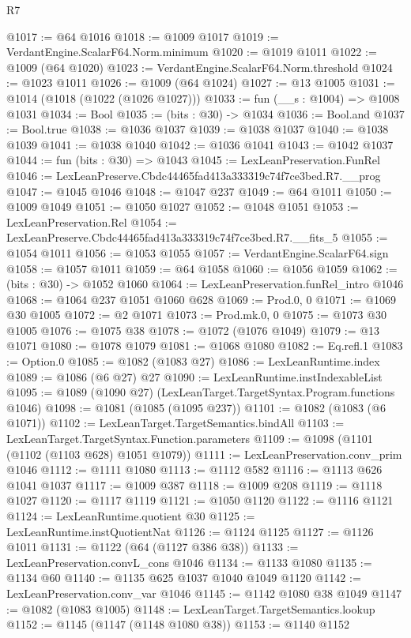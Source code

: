 \begin{lexlean}{R7}
\begin{coremodule}
@1017 := @64 @1016
@1018 := @1009 @1017
@1019 := VerdantEngine.ScalarF64.Norm.minimum
@1020 := @1019 @1011
@1022 := @1009 (@64 @1020)
@1023 := VerdantEngine.ScalarF64.Norm.threshold
@1024 := @1023 @1011
@1026 := @1009 (@64 @1024)
@1027 := @13 @1005
@1031 := @1014 (@1018 (@1022 (@1026 @1027)))
@1033 := fun (__s : @1004) => @1008 @1031
@1034 := Bool
@1035 := (bits : @30) -> @1034
@1036 := Bool.and
@1037 := Bool.true
@1038 := @1036 @1037
@1039 := @1038 @1037
@1040 := @1038 @1039
@1041 := @1038 @1040
@1042 := @1036 @1041
@1043 := @1042 @1037
@1044 := fun (bits : @30) => @1043
@1045 := LexLeanPreservation.FunRel
@1046 := LexLeanPreserve.Cbdc44465fad413a333319c74f7ce3bed.R7.__prog
@1047 := @1045 @1046
@1048 := @1047 @237
@1049 := @64 @1011
@1050 := @1009 @1049
@1051 := @1050 @1027
@1052 := @1048 @1051
@1053 := LexLeanPreservation.Rel
@1054 := LexLeanPreserve.Cbdc44465fad413a333319c74f7ce3bed.R7.__fits_5
@1055 := @1054 @1011
@1056 := @1053 @1055
@1057 := VerdantEngine.ScalarF64.sign
@1058 := @1057 @1011
@1059 := @64 @1058
@1060 := @1056 @1059
@1062 := (bits : @30) -> @1052 @1060
@1064 := LexLeanPreservation.funRel_intro @1046
@1068 := @1064 @237 @1051 @1060 @628
@1069 := Prod.{0, 0}
@1071 := @1069 @30 @1005
@1072 := @2 @1071
@1073 := Prod.mk.{0, 0}
@1075 := @1073 @30 @1005
@1076 := @1075 @38
@1078 := @1072 (@1076 @1049)
@1079 := @13 @1071
@1080 := @1078 @1079
@1081 := @1068 @1080
@1082 := Eq.refl.{1}
@1083 := Option.{0}
@1085 := @1082 (@1083 @27)
@1086 := LexLeanRuntime.index
@1089 := @1086 (@6 @27) @27
@1090 := LexLeanRuntime.instIndexableList
@1095 := @1089 (@1090 @27) (LexLeanTarget.TargetSyntax.Program.functions @1046)
@1098 := @1081 (@1085 (@1095 @237))
@1101 := @1082 (@1083 (@6 @1071))
@1102 := LexLeanTarget.TargetSemantics.bindAll
@1103 := LexLeanTarget.TargetSyntax.Function.parameters
@1109 := @1098 (@1101 (@1102 (@1103 @628) @1051 @1079))
@1111 := LexLeanPreservation.conv_prim @1046
@1112 := @1111 @1080
@1113 := @1112 @582
@1116 := @1113 @626 @1041 @1037
@1117 := @1009 @387
@1118 := @1009 @208
@1119 := @1118 @1027
@1120 := @1117 @1119
@1121 := @1050 @1120
@1122 := @1116 @1121
@1124 := LexLeanRuntime.quotient @30
@1125 := LexLeanRuntime.instQuotientNat
@1126 := @1124 @1125
@1127 := @1126 @1011
@1131 := @1122 (@64 (@1127 @386 @38))
@1133 := LexLeanPreservation.convL_cons @1046
@1134 := @1133 @1080
@1135 := @1134 @60
@1140 := @1135 @625 @1037 @1040 @1049 @1120
@1142 := LexLeanPreservation.conv_var @1046
@1145 := @1142 @1080 @38 @1049
@1147 := @1082 (@1083 @1005)
@1148 := LexLeanTarget.TargetSemantics.lookup
@1152 := @1145 (@1147 (@1148 @1080 @38))
@1153 := @1140 @1152

\end{coremodule}
\end{lexlean}
